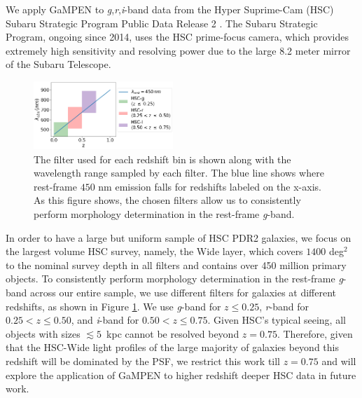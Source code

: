 \documentclass[linenumbers,twocolumn,twocolappendix]{aastex631}
\newcommand\gampen{GaMPEN}
\newcommand\gb{\textit{g}}
\newcommand\rb{\textit{r}}
\newcommand\ib{\textit{i}}
\begin{document}
\begin{CJK*}{UTF8}{gbsn}
We apply \gampen{} to \textit{g},\textit{r},\textit{i}-band data from the Hyper Suprime-Cam (HSC) Subaru Strategic Program Public Data Release 2 \citep[PDR2;][]{hsc_pdr2}. The Subaru Strategic Program, ongoing since 2014, uses the HSC prime-focus camera, which provides extremely high sensitivity and resolving power due to the large 8.2 meter mirror of the Subaru Telescope. 
\begin{figure}[htb]
    \centering
    \includegraphics[width = 0.47\textwidth]{data_lambda.png}
    \caption{
    The filter used for each redshift bin is shown along with the wavelength range sampled by each filter. The blue line shows where rest-frame $450$ nm emission falls for redshifts labeled on the x-axis. As this figure shows, the chosen filters allow us to consistently perform morphology determination in the rest-frame \gb{}-band.}
    \label{fig:hsc_response}
\end{figure}

In order to have a large but uniform sample of HSC PDR2 galaxies, we focus on the largest volume HSC survey, namely, the Wide layer, which covers $1400$ deg$^2$ to the nominal survey depth in all filters and contains over 450 million primary objects. To consistently perform morphology determination in the rest-frame \gb-band across our entire sample, we use different filters for galaxies at different redshifts, as shown in Figure \ref{fig:hsc_response}. We use \gb-band for $z\leq0.25$, \rb-band for $0.25<z\leq0.50$, and \ib-band for $0.50<z\leq0.75$. Given HSC's typical seeing, all objects with sizes $\lesssim5$\, kpc cannot be resolved beyond $z=0.75$. Therefore, given that the HSC-Wide light profiles of the large majority of galaxies beyond this redshift will be dominated by the PSF, we restrict this work till $z=0.75$ and will explore the application of \gampen{} to higher redshift deeper HSC data in future work. 


\end{CJK*}
\end{document}
